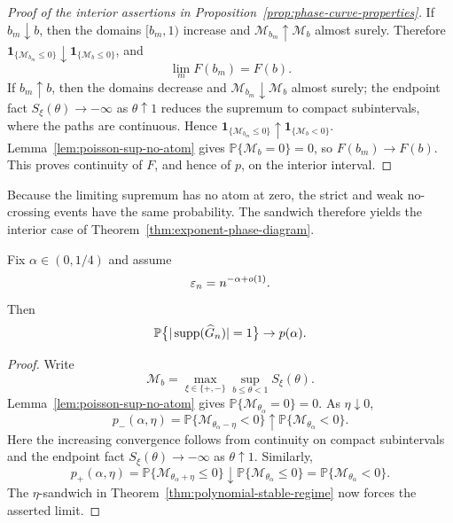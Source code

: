 \begin{proof}[Proof of the interior assertions in
Proposition~\ref{prop:phase-curve-properties}]
If $b_m\downarrow b$, then the domains $[b_m,1)$ increase and $\mathcal M_{b_m}\uparrow\mathcal M_b$ almost surely. Therefore $\mathbf 1_{\{\mathcal M_{b_m}\le0\}}\downarrow\mathbf 1_{\{\mathcal M_b\le0\}}$, and
\[
    \lim_mF(b_m)=F(b).
\]
If $b_m\uparrow b$, then the domains decrease and $\mathcal M_{b_m}\downarrow\mathcal M_b$ almost surely; the endpoint fact $S_\xi(\theta)\to-\infty$ as $\theta\uparrow1$ reduces the supremum to compact subintervals, where the paths are continuous. Hence $\mathbf 1_{\{\mathcal M_{b_m}\le0\}}\uparrow\mathbf 1_{\{\mathcal M_b<0\}}$. Lemma~\ref{lem:poisson-sup-no-atom} gives $\mathbb P\{\mathcal M_b=0\}=0$, so $F(b_m)\to F(b)$. This proves continuity of $F$, and hence of $p$, on the interior interval.
\end{proof}

Because the limiting supremum has no atom at zero, the strict and weak
no-crossing events have the same probability. The sandwich therefore yields
the interior case of Theorem~\ref{thm:exponent-phase-diagram}.
\begin{proposition}
\label{prop:interior-polynomial-limit}
Fix $\alpha\in(0,1/4)$ and assume
\[
    \varepsilon_n=n^{-\alpha+o(1)}.
\]
Then
\[
    \mathbb P\bigl\{|\operatorname{supp}(\widehat G_n)|=1\bigr\}
    \to
    p(\alpha).
\]
\end{proposition}

\begin{proof}
Write
\[
    \mathcal M_b
    =
    \max_{\xi\in\{+,-\}}
    \sup_{b\le\theta<1}S_\xi(\theta).
\]
Lemma~\ref{lem:poisson-sup-no-atom} gives $\mathbb P\{\mathcal M_{\theta_\alpha}=0\}=0$.
As $\eta\downarrow0$,
\[
    p_-(\alpha,\eta)
    =
    \mathbb P\{\mathcal M_{\theta_\alpha-\eta}<0\}
    \uparrow
    \mathbb P\{\mathcal M_{\theta_\alpha}<0\}.
\]
Here the increasing convergence follows from continuity on compact subintervals and the endpoint fact $S_\xi(\theta)\to-\infty$ as $\theta\uparrow1$.
Similarly,
\[
    p_+(\alpha,\eta)
    =
    \mathbb P\{\mathcal M_{\theta_\alpha+\eta}\le0\}
    \downarrow
    \mathbb P\{\mathcal M_{\theta_\alpha}\le0\}
    =
    \mathbb P\{\mathcal M_{\theta_\alpha}<0\}.
\]
The $\eta$-sandwich in Theorem~\ref{thm:polynomial-stable-regime} now forces the asserted limit.
\end{proof}

